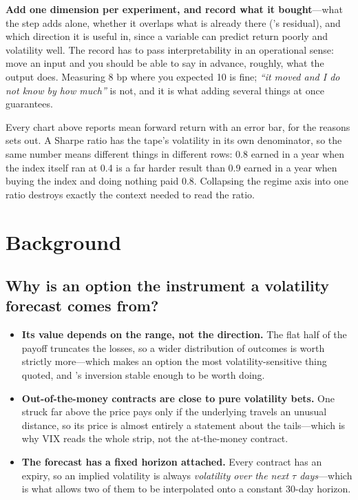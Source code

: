 \textbf{Add one dimension per experiment, and record what it bought}---what the step adds alone,
whether it overlaps what is already there ('s residual), and which
direction it is useful in, since a variable can predict return poorly and volatility well. The
record has to pass interpretability in an operational sense: move an input and you should be able to
say in advance, roughly, what the output does. Measuring 8 bp where you expected 10 is fine;
\emph{``it moved and I do not know by how much''} is not, and it is what adding several things at
once guarantees.

\begin{note}
Every chart above reports mean forward return with an error bar, for the reasons
 sets out. A Sharpe ratio has the tape's volatility in its own
denominator, so the same number means different things in different rows: 0.8 earned in a year when
the index itself ran at 0.4 is a far harder result than 0.9 earned in a year when buying the index
and doing nothing paid 0.8. Collapsing the regime axis into one ratio destroys exactly the context
needed to read the ratio.
\end{note}


\section*{Background}

\subsection*{Why is an option the instrument a volatility forecast comes from?}

\begin{itemize}
  \item \textbf{Its value depends on the range, not the direction.} The flat half of the payoff
        truncates the losses, so a wider distribution of outcomes is worth strictly more---which
        makes an option the most volatility-sensitive thing quoted, and
        's inversion stable enough to be worth doing.
  \item \textbf{Out-of-the-money contracts are close to pure volatility bets.} One struck far above
        the price pays only if the underlying travels an unusual distance, so its price is almost
        entirely a statement about the tails---which is why VIX reads the whole strip, not the
        at-the-money contract.
  \item \textbf{The forecast has a fixed horizon attached.} Every contract has an expiry, so an
        implied volatility is always \emph{volatility over the next $\tau$ days}---which is what
        allows two of them to be interpolated onto a constant 30-day horizon.
\end{itemize}


